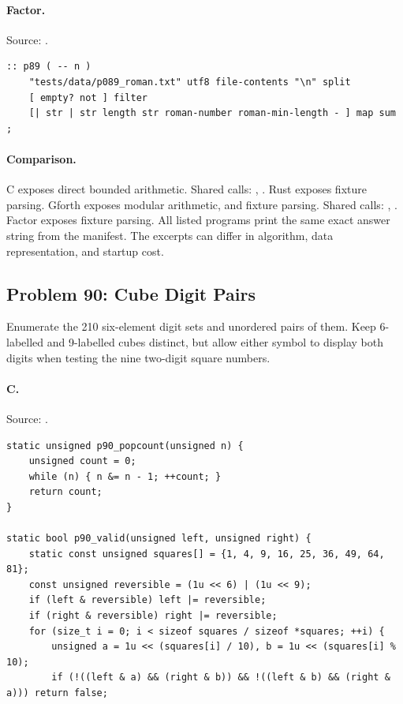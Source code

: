 \paragraph{Factor.} Source: .
\begin{lstlisting}
:: p89 ( -- n )
    "tests/data/p089_roman.txt" utf8 file-contents "\n" split
    [ empty? not ] filter
    [| str | str length str roman-number roman-min-length - ] map sum ;
\end{lstlisting}

\paragraph{Comparison.}
C exposes direct bounded arithmetic. Shared calls: \texttt{}, \texttt{}. Rust exposes fixture parsing. Gforth exposes modular arithmetic, and fixture parsing. Shared calls: \texttt{}, \texttt{}. Factor exposes fixture parsing.
All listed programs print the same exact answer string from the manifest. The excerpts can differ in algorithm, data representation, and startup cost.

\subsection{Problem 90: Cube Digit Pairs}
\label{walkthrough:p90}
Enumerate the 210 six-element digit sets and unordered pairs of them. Keep 6-labelled and 9-labelled cubes distinct, but allow either symbol to display both digits when testing the nine two-digit square numbers.

\paragraph{C.} Source: .
\begin{lstlisting}
static unsigned p90_popcount(unsigned n) {
    unsigned count = 0;
    while (n) { n &= n - 1; ++count; }
    return count;
}

static bool p90_valid(unsigned left, unsigned right) {
    static const unsigned squares[] = {1, 4, 9, 16, 25, 36, 49, 64, 81};
    const unsigned reversible = (1u << 6) | (1u << 9);
    if (left & reversible) left |= reversible;
    if (right & reversible) right |= reversible;
    for (size_t i = 0; i < sizeof squares / sizeof *squares; ++i) {
        unsigned a = 1u << (squares[i] / 10), b = 1u << (squares[i] % 10);
        if (!((left & a) && (right & b)) && !((left & b) && (right & a))) return false;
\end{lstlisting}

